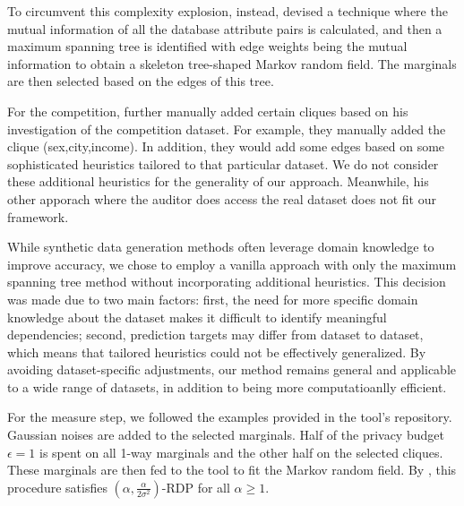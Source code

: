 \documentclass[manuscript,screen,review,anonymous]{acmart}
\begin{document}
To circumvent this complexity explosion, instead, \cite{mckenna2021winning} devised a technique where the mutual information of all the database attribute pairs is calculated, and then a maximum spanning tree is identified with edge weights being the mutual information to obtain a skeleton tree-shaped Markov random field. The marginals are then selected based on the edges of this tree.

For the competition, \cite{mckenna2021winning} further manually added certain cliques based on his investigation of the competition dataset. For example, they manually added the clique (sex,city,income). In addition, they would add some edges based on some sophisticated heuristics tailored to that particular dataset. We do not consider these additional heuristics for the generality of our approach. Meanwhile, his other apporach where the auditor does access the real dataset does not fit our framework.

While synthetic data generation methods often leverage domain knowledge to improve accuracy, we chose to employ a vanilla approach with only the maximum spanning tree method without incorporating additional heuristics. This decision was made due to two main factors: first, the need for more specific domain knowledge about the dataset makes it difficult to identify meaningful dependencies; second, prediction targets may differ from dataset to dataset, which means that tailored heuristics could not be effectively generalized. By avoiding dataset-specific adjustments, our method remains general and applicable to a wide range of datasets, in addition to being more computatioanlly efficient.


For the measure step, we followed the examples provided in the tool's repository. Gaussian noises are added to the selected marginals. Half of the privacy budget $\epsilon = 1$ is spent on all 1-way marginals and the other half on the selected cliques. These marginals are then fed to the tool to fit the Markov random field. By \cite{mckenna2021winning}, this procedure satisfies $(\alpha,\frac{\alpha}{2 \sigma^2})$-RDP for all $\alpha \geq 1$.
\end{document}
